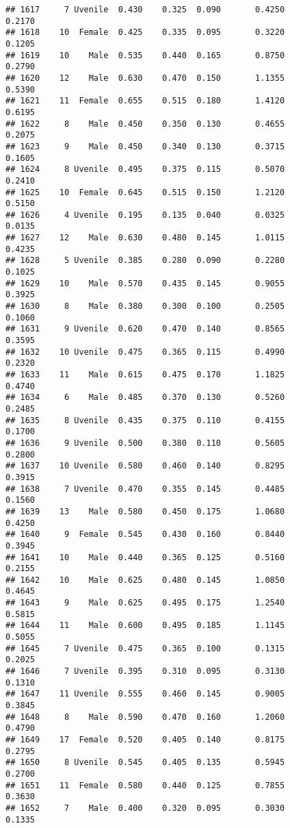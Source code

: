 \documentclass[
]{article}
\begin{document}
\begin{verbatim}
## 1617     7 Uvenile  0.430    0.325  0.090       0.4250         0.2170
## 1618    10  Female  0.425    0.335  0.095       0.3220         0.1205
## 1619    10    Male  0.535    0.440  0.165       0.8750         0.2790
## 1620    12    Male  0.630    0.470  0.150       1.1355         0.5390
## 1621    11  Female  0.655    0.515  0.180       1.4120         0.6195
## 1622     8    Male  0.450    0.350  0.130       0.4655         0.2075
## 1623     9    Male  0.450    0.340  0.130       0.3715         0.1605
## 1624     8 Uvenile  0.495    0.375  0.115       0.5070         0.2410
## 1625    10  Female  0.645    0.515  0.150       1.2120         0.5150
## 1626     4 Uvenile  0.195    0.135  0.040       0.0325         0.0135
## 1627    12    Male  0.630    0.480  0.145       1.0115         0.4235
## 1628     5 Uvenile  0.385    0.280  0.090       0.2280         0.1025
## 1629    10    Male  0.570    0.435  0.145       0.9055         0.3925
## 1630     8    Male  0.380    0.300  0.100       0.2505         0.1060
## 1631     9 Uvenile  0.620    0.470  0.140       0.8565         0.3595
## 1632    10 Uvenile  0.475    0.365  0.115       0.4990         0.2320
## 1633    11    Male  0.615    0.475  0.170       1.1825         0.4740
## 1634     6    Male  0.485    0.370  0.130       0.5260         0.2485
## 1635     8 Uvenile  0.435    0.375  0.110       0.4155         0.1700
## 1636     9 Uvenile  0.500    0.380  0.110       0.5605         0.2800
## 1637    10 Uvenile  0.580    0.460  0.140       0.8295         0.3915
## 1638     7 Uvenile  0.470    0.355  0.145       0.4485         0.1560
## 1639    13    Male  0.580    0.450  0.175       1.0680         0.4250
## 1640     9  Female  0.545    0.430  0.160       0.8440         0.3945
## 1641    10    Male  0.440    0.365  0.125       0.5160         0.2155
## 1642    10    Male  0.625    0.480  0.145       1.0850         0.4645
## 1643     9    Male  0.625    0.495  0.175       1.2540         0.5815
## 1644    11    Male  0.600    0.495  0.185       1.1145         0.5055
## 1645     7 Uvenile  0.475    0.365  0.100       0.1315         0.2025
## 1646     7 Uvenile  0.395    0.310  0.095       0.3130         0.1310
## 1647    11 Uvenile  0.555    0.460  0.145       0.9005         0.3845
## 1648     8    Male  0.590    0.470  0.160       1.2060         0.4790
## 1649    17  Female  0.520    0.405  0.140       0.8175         0.2795
## 1650     8 Uvenile  0.545    0.405  0.135       0.5945         0.2700
## 1651    11  Female  0.580    0.440  0.125       0.7855         0.3630
## 1652     7    Male  0.400    0.320  0.095       0.3030         0.1335

\end{verbatim}
\end{document}
